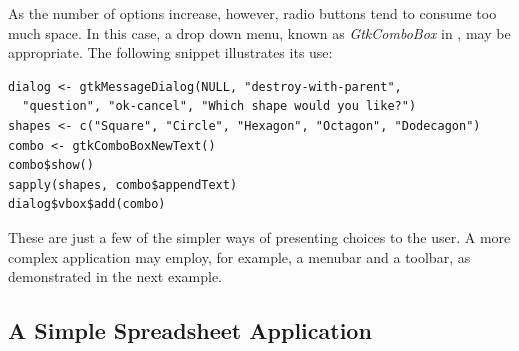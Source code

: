 \documentclass[article]{jss}
\begin{document}
As the number of options increase, however, radio buttons tend to consume too 
much space. In this case, a drop down menu, known as \emph{GtkComboBox} in
, may be appropriate. The following snippet illustrates its use:
\begin{verbatim}
dialog <- gtkMessageDialog(NULL, "destroy-with-parent", 
  "question", "ok-cancel", "Which shape would you like?")
shapes <- c("Square", "Circle", "Hexagon", "Octagon", "Dodecagon")
combo <- gtkComboBoxNewText()
combo$show()
sapply(shapes, combo$appendText)
dialog$vbox$add(combo)
\end{verbatim}

These are just a few of the simpler ways of presenting choices to the user. 
A more complex application may employ, for example, a menubar
and a toolbar, as demonstrated in the next example.

\subsection{A Simple Spreadsheet Application}\label{sec:spreadsheet-example}
\end{document}
